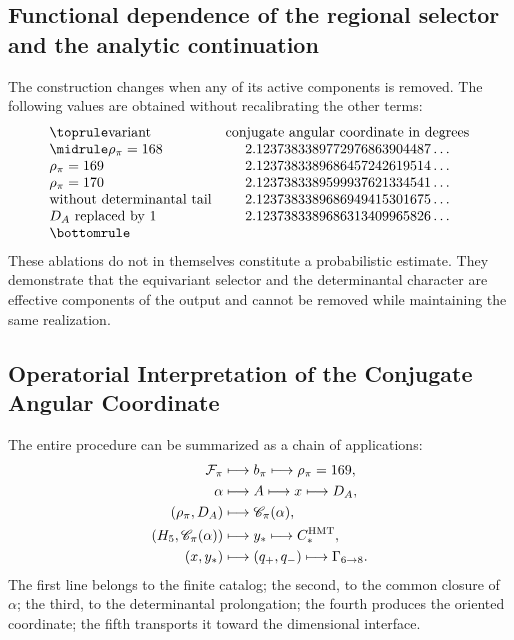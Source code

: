 \subsection{Functional dependence of the regional selector and the analytic continuation}
\label{sec:s102:c38:7:2}


The construction changes when any of its active components is removed.
The following values are obtained without recalibrating the other terms:
\[
\begin{array}{@{}lc@{}}
\toprule
\text{variant}&\text{conjugate angular coordinate in degrees}\\
\midrule
\rho_\pi=168&2.1237383389772976863904487\ldots\\
\rho_\pi=169&2.1237383389686457242619514\ldots\\
\rho_\pi=170&2.1237383389599937621334541\ldots\\
\text{without determinantal tail}&2.1237383389686949415301675\ldots\\
D_A\text{ replaced by }1&2.1237383389686313409965826\ldots\\
\bottomrule
\end{array}
\]
These ablations do not in themselves constitute a probabilistic estimate.
They demonstrate that the equivariant selector and the determinantal character are
effective components of the output and cannot be removed while maintaining the
same realization.

\subsection{Operatorial Interpretation of the Conjugate Angular Coordinate}
\label{sec:s102:c38:7:3}


The entire procedure can be summarized as a chain of applications:
\[
\begin{aligned}
\mathcal F_\pi
&\longmapsto b_\pi
\longmapsto\rho_\pi=169,\\
\alpha
&\longmapsto A
\longmapsto x
\longmapsto D_A,\\
(\rho_\pi,D_A)
&\longmapsto\mathscr C_\pi(\alpha),\\
(H_5,\mathscr C_\pi(\alpha))
&\longmapsto y_*
\longmapsto C_*^{\rm HMT},\\
(x,y_*)
&\longmapsto(q_+,q_-)
\longmapsto\Gamma_{6\to8}.
\end{aligned}
\]
The first line belongs to the finite catalog; the second, to the common closure of
\(\alpha\); the third, to the determinantal prolongation; the fourth produces the
oriented coordinate; the fifth transports it toward the dimensional interface.

